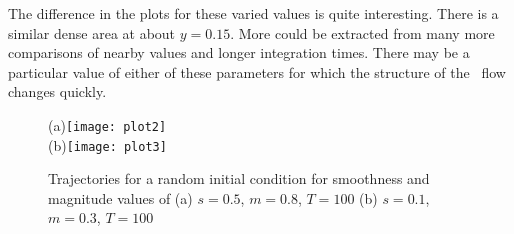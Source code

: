 \documentclass[pre,twocolumn,groupedaddress]{revtex4}
\begin{document}
{The difference in the plots for these varied values is quite
interesting. There is a similar dense area at about $y=0.15$.
More could be extracted from many more comparisons of nearby values
and longer integration times. There may be a particular value of
either of these parameters for which the structure of the \statesp\
flow changes quickly. \\
\begin{figure}[htbp]
  (a)\texttt{[image: plot2]}\\
  (b)\texttt{[image: plot3]}
  \caption{Trajectories for a random initial
  condition for smoothness and magnitude
  values of
    (a) $ s=0.5 $,  $m=0.8 $, $T=100$
    (b)  $s=0.1 $,  $m=0.3 $, $T=100$
          }
          \label{eltonFig:random1}
  \end{figure}

}
\end{document}
